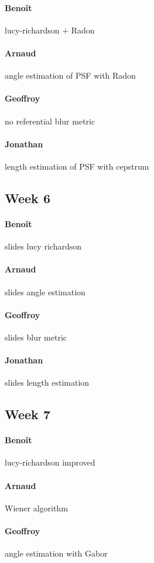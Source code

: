 \paragraph{Benoît} lucy-richardson + Radon
\paragraph{Arnaud} angle estimation of PSF with Radon
\paragraph{Geoffroy} no referential blur metric
\paragraph{Jonathan} length estimation of PSF with cepstrum

\subsection*{Week 6}
\paragraph{Benoît} slides lucy richardson
\paragraph{Arnaud} slides angle estimation
\paragraph{Geoffroy} slides blur metric 
\paragraph{Jonathan} slides length estimation

\subsection*{Week 7}
\paragraph{Benoît} lucy-richardson improved
\paragraph{Arnaud} Wiener algorithm
\paragraph{Geoffroy} angle estimation with Gabor

